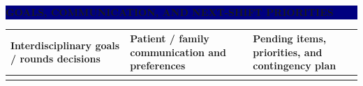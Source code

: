 \documentclass[10pt,letterpaper,landscape]{article}
\newcommand{\sectionbar}[1]{%
  \noindent\colorbox{navy}{\parbox{\dimexpr\linewidth-2\fboxsep\relax}{\color{white}\bfseries\scriptsize\MakeUppercase{#1}}}\vspace{1.5pt}}
\begin{document}
\vspace{3pt}
\sectionbar{Goals, communication, and next-shift priorities}
{\fontsize{6.35}{6.9}\selectfont
\begin{tabularx}{\linewidth}{|X|X|X|}
\hline
\rowcolor{blue}\textbf{Interdisciplinary goals / rounds decisions} & \textbf{Patient / family communication and preferences} & \textbf{Pending items, priorities, and contingency plan}\\\hline
\rule{0pt}{4.6ex} & & \\\hline
\end{tabularx}}
\end{document}

